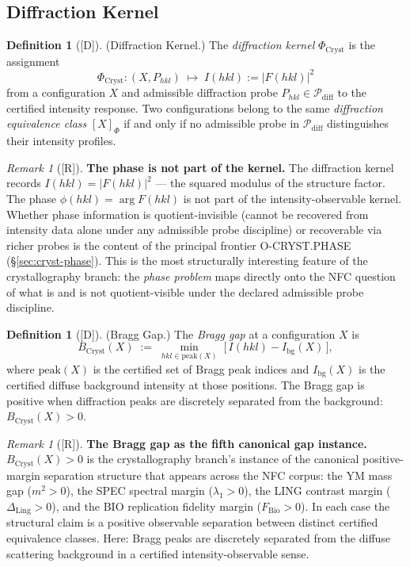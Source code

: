 \documentclass[12pt,oneside]{amsbook}
\theoremstyle{plain}
\theoremstyle{definition}
\newtheorem{definition}[theorem]{Definition}
\theoremstyle{remark}
\newtheorem{remark}[theorem]{Remark}
\newcommand{\status}[1]{\textup{[#1]}}
\begin{document}
\subsection{Diffraction Kernel}

\begin{definition}[\status{D}]\label{def:cryst-diffraction-kernel}
\textup{(Diffraction Kernel.)}
The \emph{diffraction kernel} $\Phi_{\mathrm{Cryst}}$ is the
assignment
\[
  \Phi_{\mathrm{Cryst}} : (X, P_{hkl}) \;\mapsto\;
  I(hkl) := |F(hkl)|^2
\]
from a configuration $X$ and admissible diffraction probe
$P_{hkl} \in \mathcal{P}_{\mathrm{diff}}$ to the certified
intensity response.  Two configurations belong to the same
\emph{diffraction equivalence class} $[X]_{\Phi}$ if and only if
no admissible probe in $\mathcal{P}_{\mathrm{diff}}$ distinguishes
their intensity profiles.
\end{definition}

\begin{remark}[\status{R}]\label{rem:cryst-phase-note}
\textbf{The phase is not part of the kernel.}
The diffraction kernel records $I(hkl) = |F(hkl)|^2$ --- the
squared modulus of the structure factor.  The phase
$\phi(hkl) = \arg F(hkl)$ is not part of the intensity-observable
kernel.  Whether phase information is quotient-invisible (cannot
be recovered from intensity data alone under any admissible probe
discipline) or recoverable via richer probes is the content of the
principal frontier O-CRYST.PHASE (§\ref{sec:cryst-phase}).  This
is the most structurally interesting feature of the crystallography
branch: the \emph{phase problem} maps directly onto the NFC
question of what is and is not quotient-visible under the declared
admissible probe discipline.
\end{remark}

\begin{definition}[\status{D}]\label{def:cryst-bragg-gap}
\textup{(Bragg Gap.)}
The \emph{Bragg gap} at a configuration $X$ is
\[
  B_{\mathrm{Cryst}}(X) \;:=\;
  \min_{hkl \in \mathrm{peak}(X)}\;
  \bigl[\,I(hkl) - I_{\mathrm{bg}}(X)\,\bigr],
\]
where $\mathrm{peak}(X)$ is the certified set of Bragg peak
indices and $I_{\mathrm{bg}}(X)$ is the certified diffuse
background intensity at those positions.  The Bragg gap is
positive when diffraction peaks are discretely separated from the
background: $B_{\mathrm{Cryst}}(X) > 0$.
\end{definition}

\begin{remark}[\status{R}]\label{rem:cryst-gap-analogy}
\textbf{The Bragg gap as the fifth canonical gap instance.}
$B_{\mathrm{Cryst}}(X) > 0$ is the crystallography branch's instance
of the canonical positive-margin separation structure that appears
across the NFC corpus: the YM mass gap ($m^2 > 0$), the SPEC
spectral margin ($\lambda_1 > 0$), the LING contrast margin
($\Delta_{\mathrm{Ling}} > 0$), and the BIO replication fidelity
margin ($F_{\mathrm{Bio}} > 0$).  In each case the structural claim
is a positive observable separation between distinct certified
equivalence classes.  Here: Bragg peaks are discretely separated
from the diffuse scattering background in a certified
intensity-observable sense.
\end{remark}
\end{document}
